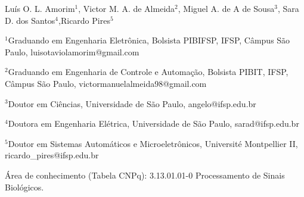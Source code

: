 \begin{center}
Luís O. L. Amorim$^1$,  Victor M. A. de Almeida$^2$, Miguel A. de A de Sousa$^3$, Sara D. dos Santos$^4$,Ricardo Pires$^5$
\vspace{0.5cm}










\end{center}

\begingroup
    \fontsize{9pt}{11pt}\selectfont
  
  $^1$Graduando em Engenharia Eletrônica, Bolsista PIBIFSP, IFSP, Câmpus São Paulo, luisotaviolamorim@gmail.com
  
  $^2$Graduando em Engenharia de Controle e Automação, Bolsista PIBIT, IFSP, Câmpus São Paulo, victormanuelalmeida98@gmail.com
  
  $^3$Doutor em Ciências, Universidade de São Paulo, angelo@ifsp.edu.br
  
  $^4$Doutora em Engenharia Elétrica, Universidade de São Paulo, sarad@ifsp.edu.br
  
  $^5$Doutor em Sistemas Automáticos e Microeletrônicos, Université Montpellier II, ricardo\_pires@ifsp.edu.br

Área de conhecimento (Tabela CNPq): 3.13.01.01-0 Processamento de Sinais Biológicos. 
\endgroup

